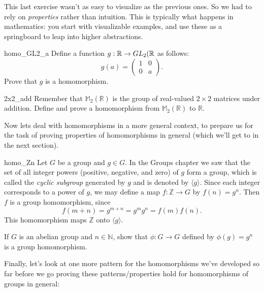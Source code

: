 \begin{rem}
This last exercise wasn't as easy to visualize as the previous ones.  So we had to rely on \emph{properties} rather than intuition. This is typically what happens in mathematics: you start with visualizable examples, and use these as a springboard to leap into higher abstractions.
\end{rem}

\begin{exercise}{homo_GL2_a}
Define a function $g: \mathbb{R} \rightarrow GL_2( {\mathbb R }$ as follows:
\[
g(a) = \left(
\begin{array}{cc}
1 & 0 \\
0 & a
\end{array}
\right).
\]
Prove that $g$ is a homomorphism.
\end{exercise}

\begin{exercise}{2x2_add}
Remember that  ${\mathbb M}_2( {\mathbb R})$ is the group of real-valued $2 \times 2$ matrices under addition.  Define and prove a homomorphism from ${\mathbb M}_2( {\mathbb R})$ to ${\mathbb R}$.
\end{exercise}

Now lets deal with homomorphisms in a more general context, to prepare us for the task of proving  properties of homomorphisms in general (which we'll get to in the next section).
 
\begin{example}{homo_Zn}
Let $G$ be a group and $g \in G$. In the Groups chapter we saw that the set of all integer powers (positive, negative, and zero) of $g$ form a group, which is called the
\emph{cyclic subgroup} generated by $g$ and is denoted by $\langle g \rangle$. 
Since each integer corresponds to a power of $g$, we may define a map $f : {\mathbb Z}
\rightarrow G$ by $f( n ) = g^n$. Then $f$ is a group
homomorphism, since 
\[
f( m + n ) = g^{ m + n} = g^m g^n = f( m ) f( n ).
\]
This homomorphism maps ${\mathbb Z}$ onto $\langle g \rangle$.
\end{example}


 
\begin{exercise}{}
If $G$ is an abelian group and $n \in {\mathbb N}$, show that $\phi : G
\rightarrow G$  defined by $\phi(g) = g^n$ is a group homomorphism.  
\end{exercise}

Finally, let's look at one more pattern for the homomorphisms we've developed so far before we go proving these patterns/properties hold for homomorphisms of groups in general:

